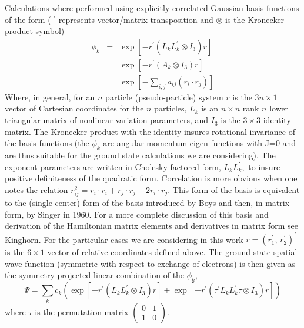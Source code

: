 \documentclass[12pt,thmsa]{article}
\begin{document}
Calculations where performed using explicitly correlated Gaussian basis
functions of the form ( $^{\prime }$ represents vector/matrix transposition
and $\otimes $ is the Kronecker product symbol) 
\begin{eqnarray}
\phi _k &=&\exp \left[ -r^{\prime }\left( L_kL_k^{\prime }\otimes I_3\right)
r\right]   \label{ECG} \\
&=&\exp \left[ -r^{\prime }\left( A_k\otimes I_3\right) r\right]   \nonumber
\\
&=&\exp \left[ -\sum_{i,j}a_{ij}\left( r_i\cdot r_j\right) \right]  
\nonumber
\end{eqnarray}
Where, in general, for an $n$ particle (pseudo-particle) system $r$ is the $%
3n\times 1$ vector of Cartesian coordinates for the $n$ particles, $L_k$ is
an $n\times n$ rank $n$ lower triangular matrix of nonlinear variation
parameters, and $I_3$ is the $3\times 3$ identity matrix. The Kronecker
product with the identity insures rotational invariance of the basis
functions (the $\phi _k$ are angular momentum eigen-functions with J=0 and
are thus suitable for the ground state calculations we are considering). The
exponent parameters are written in Cholesky factored form, $L_kL_k^{\prime },
$ to insure positive definiteness of the quadratic form. Correlation is more
obvious when one notes the relation $r_{ij}^2=r_i\cdot r_i+r_j\cdot
r_j-2r_i\cdot r_j.$ This form of the basis is equivalent to the (single
center) form of the basis introduced by Boys\cite{Boys} and then, in matrix
form, by Singer\cite{Singer1} in 1960. For a more complete discussion of
this basis and derivation of the Hamiltonian matrix elements and derivatives
in matrix form see Kinghorn\cite{Kinghorn95a,Kinghorn95b}. For the
particular cases we are considering in this work $r=\left( r_1^{\prime
},\,r_2^{\prime }\right) ^{\prime }$ is the $6\times 1$ vector of relative
coordinates defined above. The ground state spatial wave function (symmetric
with respect to exchange of electrons) is then given as the symmetry
projected linear combination of the $\phi _k$, 
\begin{equation}
\Psi =\sum_kc_k\left( \exp \left[ -r^{\prime }\left( L_kL_k^{\prime }\otimes
I_3\right) r\right] +\exp \left[ -r^{\prime }\left( \tau ^{\prime
}L_kL_k^{\prime }\tau \otimes I_3\right) r\right] \right) 
\end{equation}
where $\tau $ is the permutation matrix $\left( 
\begin{array}{cc}
0 & 1 \\ 
1 & 0
\end{array}
\right) .$
\end{document}
